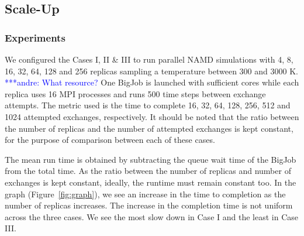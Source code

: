 \documentclass[a4paper,10pt]{article}
\newcommand{\alnote}[1]{ {\textcolor{blue} { ***andre: #1 }}}
\newcommand{\alnote}[1]{}
\begin{document}


\subsection{Scale-Up}

\subsubsection{Experiments}
We configured the Cases I, II \& III to run parallel NAMD simulations with 4, 8, 16, 32, 64, 128 and 256 replicas sampling a temperature between 300 and 3000 K. \alnote{What resource?} One BigJob is launched with sufficient cores while each replica uses 16 MPI processes and runs 500 time steps between exchange attempts. The metric used is the time to complete 16, 32, 64, 128, 256, 512 and 1024 attempted exchanges, respectively. It should be noted that the ratio between the number of replicas and the number of attempted exchanges is kept constant, for the purpose of comparison between each of these cases.  %

The mean run time is obtained by subtracting the queue wait time of the BigJob from the total time. As the ratio between the number of replicas and number of exchanges is kept constant, ideally, the runtime must remain constant too. In the graph (Figure~\ref{fig:graph}), we see an increase in the time to completion as the number of replicas increases. The increase in the completion time is not uniform across the three cases. We see the most slow down in Case I and the least in Case III.
\end{document}
